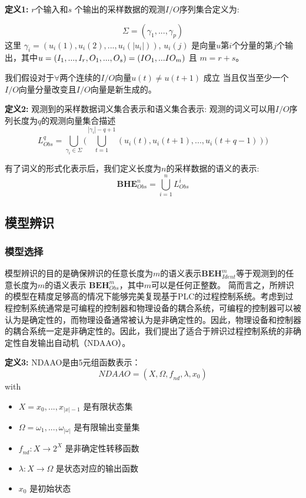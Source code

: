 \textbf{定义1:} \( r \)个输入和$ s $ 个输出的采样数据的观测$I/O$序列集合定义\parencite{xiao2016construction}为:

\begin{equation} 
\Sigma = (\gamma_1,...,\gamma_p) 
\end{equation} 这里 $\gamma_i = (u_i(1),u_i(2),...,u_i(|u_i|))$, $ u_i(j) $ 是向量$u$第$i$个分量的第$j$个输出，其中$ u = (I_1,...,I_r,O_1,\\...,O_s) = (IO_1,...IO_m) $ 且 $ m=r+s $。

我们假设对于$ \forall $两个连续的$I/O$向量$ u(t)\neq u(t + 1)$ 成立
当且仅当至少一个$I/O$向量分量改变且$I/O$向量是新生成的。

\textbf{定义2:} 观测到的采样数据词义集合表示和语义集合表示: 观测的词义可以用$I/O$序列长度为$q$的观测向量集合描述 
\[
L_{Obs}^q = \bigcup_{\gamma_i \in \Sigma} \Big(\bigcup_{t=1}^{|\gamma_i|-q+1} (u_i(t),u_i(t+1),...,u_i(t+q-1))\Big) 
\]

有了词义的形式化表示后，我们定义长度为$n$的采样数据的语义的表示:
\begin{equation}
 \textbf{BHE}_{Obs}^n = \bigcup_{i=1}^n L_{Obs}^i 
\end{equation}

\subsection{模型辨识}

\subsubsection{模型选择}

模型辨识的目的是确保辨识的任意长度为$ m $的语义表示$ \textbf {BEH}_{Ident}^m $等于观测到的任意长度为$ m $的语义表示  \( \textbf{BEH}_{Obs}^m \)，其中$ m $可以是任何正整数。 简而言之，所辨识的模型在精度足够高的情况下能够完美复现基于PLC的过程控制系统。考虑到过程控制系统通常是可编程的控制器和物理设备的耦合系统，可编程的控制器可以被认为是确定性的，而物理设备通常被认为是非确定性的。因此，物理设备和控制器的耦合系统一定是非确定性的。因此，我们提出了适合于辨识过程控制系统的非确定性自发输出自动机（NDAAO）\parencite{klein2005}。

\textbf{定义3:} NDAAO是由5元组函数表示： \[ NDAAO=(X,\Omega,\textit{f}_{nd},\lambda,x_0) \] with\
\begin{itemize}
  \item $ X={x_0,...,x_{|x|-1}} $ 是有限状态集
  \item $ \Omega={\omega_1,...,\omega_{|\omega|}} $ 是有限输出变量集
  \item $ \textit{f}_{nd}: X\rightarrow 2^X $ 是非确定性转移函数
  \item $ \lambda: X\rightarrow \Omega $ 是状态对应的输出函数
  \item $x_0$ 是初始状态
\end{itemize}

